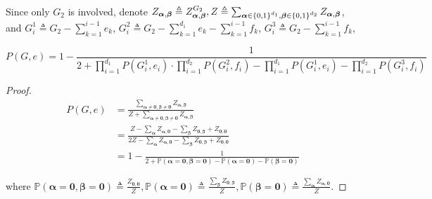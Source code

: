 Since only $G_2$ is involved, denote $Z_{\boldsymbol\alpha, \boldsymbol\beta} \triangleq Z_{\boldsymbol\alpha, \boldsymbol\beta}^{G_2}, Z \triangleq \sum_{\boldsymbol\alpha \in \left\{0,1\right\}^{d_1} , \boldsymbol\beta \in \left\{0,1\right\}^{d_2}} Z_{\boldsymbol\alpha, \boldsymbol\beta}$,
and
$G_i^1 \triangleq G_2 - \sum_{k=1}^{i-1} e_k$,
$G_i^2 \triangleq G_2 - \sum_{k=1}^{d_1}e_k - \sum_{k=1}^{i-1} f_k$,
$G_i^3 \triangleq G_2 - \sum_{k=1}^{i-1} f_k$,


\begin{Lem}
	
	\[P(G,e) =  1 - \frac{1}{2 + \prod_{i=1}^{d_1} P(G_i^1, e_i) \cdot \prod_{i=1}^{d_2} P(G_i^2, f_i) - \prod_{i=1}^{d_1} P(G_i^1, e_i) - \prod_{i=1}^{d_2} P(G_i^3, f_i)}\]

\end{Lem}
\begin{proof}

	\begin{align*}
P(G,e) &= \frac{\sum_{\boldsymbol\alpha \neq \mathbf{0}, \boldsymbol\beta \neq \mathbf{0}} Z_{\boldsymbol\alpha, \boldsymbol\beta}}{Z + \sum_{\boldsymbol\alpha \neq \mathbf{0}, \boldsymbol\beta \neq \mathbf{0}} Z_{\boldsymbol\alpha, \boldsymbol\beta}} \\
&=\frac{Z - \sum_{\boldsymbol\alpha}Z_{\boldsymbol\alpha,\mathbf{0}} - \sum_{\boldsymbol\beta} Z_{\mathbf{0}, \boldsymbol\beta} + Z_{\mathbf{0}, \mathbf{0}}}{2Z - \sum_{\boldsymbol\alpha}Z_{\boldsymbol\alpha,\mathbf{0}} - \sum_{\boldsymbol\beta} Z_{\mathbf{0}, \boldsymbol\beta} + Z_{\mathbf{0}, \mathbf{0}}} \\
&= 1 - \frac{1}{2 + \mathbb{P}\left( \boldsymbol\alpha = \mathbf{0}, \boldsymbol\beta = \mathbf{0} \right) - \mathbb{P} \left( \boldsymbol\alpha = \mathbf{0} \right) - \mathbb{P} \left( \boldsymbol\beta = \mathbf{0} \right)}
	\end{align*}

	where $\mathbb{P} \left( \boldsymbol\alpha = \mathbf{0}, \boldsymbol\beta = \mathbf{0} \right) \triangleq \frac{Z_{\mathbf{0},\mathbf{0}}}{Z}, \mathbb{P} \left( \boldsymbol\alpha = \mathbf{0} \right) \triangleq \frac{\sum_{\boldsymbol\beta} Z_{\mathbf{0}, \boldsymbol\beta} }{Z}, \mathbb{P} \left( \boldsymbol\beta = \mathbf{0} \right) \triangleq \frac{\sum_{\boldsymbol\alpha} Z_{ \boldsymbol\alpha , \mathbf{0}} }{Z}$.


\end{proof}
